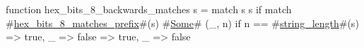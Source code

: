function hex_bits_8_backwards_matches s = match s {
  s if match #\hyperref[sailRISCVzhexzybitszy8zymatcheszyprefix]{hex\_bits\_8\_matches\_prefix}#(s) {
    #\hyperref[sailRISCVzSome]{Some}# (_, n) if n == #\hyperref[sailRISCVzstringzylength]{string\_length}#(s) => true,
    _ => false
  } => true,
  _ => false
}
